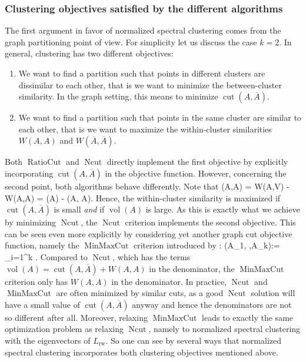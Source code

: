 \documentclass{article}
\def\ba#1\ea{\begin{align*}#1\end{align*}} %
\DeclareMathOperator{\vol}{vol} %
\newcommand{\Lrw}{L_{\text{rw}}}
\renewcommand{\bar}{\overline} %
\DeclareMathOperator{\Ratiocut}{RatioCut}
\DeclareMathOperator{\Ncut}{Ncut}
\DeclareMathOperator{\Cut}{cut}
\DeclareMathOperator{\MinmaxCut}{MinMaxCut}
\begin{document}
\subsubsection*{Clustering objectives satisfied by the different algorithms}

The first argument in favor of normalized spectral clustering comes
from the graph partitioning point of view.  For simplicity let us
discuss the case $k=2$. In general, clustering has two different
objectives:

\begin{enumerate}
\item We want to find a partition such that points in different
  clusters are dissimilar to each other, that is we want to minimize
  the between-cluster similarity. In the graph setting, this
  means to minimize $\Cut(A,\bar A)$.
\item We want to find a partition such that points in the same cluster
  are similar to each other, that is we want to maximize the
  within-cluster similarities $W(A,A)$ and $W(\bar A, \bar A)$.
\end{enumerate}


Both $\Ratiocut$ and $\Ncut$ directly implement the first objective
by explicitly incorporating  $\Cut(A, \bar A)$ in the objective function.
However, concerning the second point, both algorithms behave
differently. Note that
%
\ba
W(A,A) = W(A,V) - W(A,\bar A)
= \vol(A) - \Cut(A, \bar A).
\ea
%
Hence, the within-cluster similarity is maximized if $\Cut(A, \bar A
)$ is small {\em and } if $\vol(A)$ is large. As this is exactly what
we achieve by minimizing $\Ncut$, the $\Ncut$ criterion
implements the second objective. This can be seen even more
explicitly by considering yet another graph cut objective function,
namely the $\MinmaxCut$ criterion introduced by :
%
\ba \MinmaxCut(A_1, \hdots,A_k):= \sum_{i=1}^k \frac{\Cut(A_i,\bar
  A_i)}{W(A_i,A_i)}.  \ea
%
Compared to $\Ncut$, which has the terms $\vol(A) = \Cut(A,\bar A) +
W(A,A)$ in the denominator, the $\MinmaxCut$ criterion only has
$W(A,A)$ in the denominator.  In practice, $\Ncut$ and $\MinmaxCut$
are often minimized by similar cuts, as a good $\Ncut$ solution will
have a small value of $\Cut(A,\bar A)$ anyway and hence the
denominators are not so different after all. Moreover, relaxing
$\MinmaxCut$ leads to exactly the same optimization problem as
relaxing $\Ncut$, namely to normalized
spectral clustering with the eigenvectors of $\Lrw$. So one can see by several ways that normalized spectral clustering incorporates both clustering objectives mentioned above.\\
\end{document}
